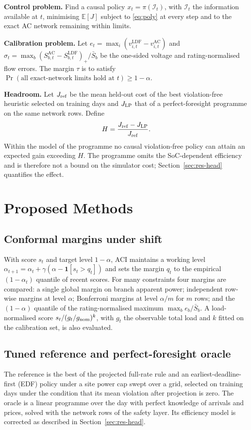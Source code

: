 \documentclass[11pt]{article}
\newcommand{\ldf}{\mathrm{LDF}}
\newcommand{\ac}{\mathrm{AC}}
\begin{document}
\textbf{Control problem.} Find a causal policy $x_t=\pi(\mathcal I_t)$, with $\mathcal I_t$ the information available at $t$, minimising $\mathbb E[J]$ subject to \eqref{eq:poly} at every step and to the exact AC network remaining within limits.

\textbf{Calibration problem.} Let $e_t=\max_i(v^\ldf_{i,t}-v^\ac_{i,t})$ and $\sigma_t=\max_b(S^\ac_{b,t}-S^\ldf_{b,t})_+/\bar S_b$ be the one-sided voltage and rating-normalised flow errors. The margin $\tau$ is to satisfy $\Pr(\text{all exact-network limits hold at }t)\ge1-\alpha$.

\textbf{Headroom.} Let $J_{\rm ref}$ be the mean held-out cost of the best violation-free heuristic selected on training days and $J_{\rm LP}$ that of a perfect-foresight programme on the same network rows. Define
\begin{equation}
H=\frac{J_{\rm ref}-J_{\rm LP}}{J_{\rm ref}}.
\end{equation}
Within the model of the programme no causal violation-free policy can attain an expected gain exceeding $H$. The programme omits the SoC-dependent efficiency and is therefore not a bound on the simulator cost; Section~\ref{sec:res-head} quantifies the effect.

\section{Proposed Methods}\label{sec:methods}
\subsection{Conformal margins under shift}
With score $s_t$ and target level $1-\alpha$, ACI maintains a working level $\alpha_{t+1}=\alpha_t+\gamma(\alpha-\mathbf 1[s_t>q_t])$ and sets the margin $q_t$ to the empirical $(1-\alpha_t)$ quantile of recent scores. For many constraints four margins are compared: a single global margin on branch apparent power; independent row-wise margins at level $\alpha$; Bonferroni margins at level $\alpha/m$ for $m$ rows; and the $(1-\alpha)$ quantile of the rating-normalised maximum $\max_b e_b/\bar S_b$. A load-normalised score $s_t/(g_t/g_{\rm nom})^{k}$, with $g_t$ the observable total load and $k$ fitted on the calibration set, is also evaluated.

\subsection{Tuned reference and perfect-foresight oracle}
The reference is the best of the projected full-rate rule and an earliest-deadline-first (EDF) policy under a site power cap swept over a grid, selected on training days under the condition that its mean violation after projection is zero. The oracle is a linear programme over the day with perfect knowledge of arrivals and prices, solved with the network rows of the safety layer. Its efficiency model is corrected as described in Section~\ref{sec:res-head}.
\end{document}
